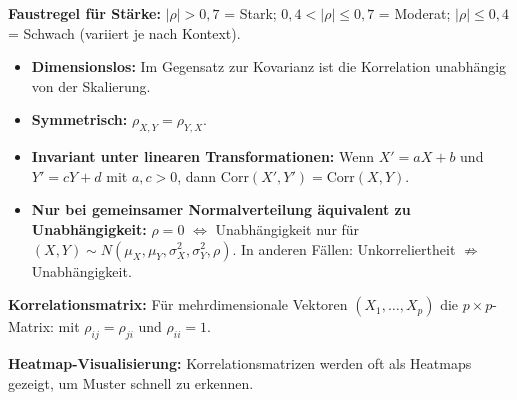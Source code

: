 \textbf{Faustregel für Stärke:} $|\rho| > 0{,}7$ = Stark; $0{,}4 < |\rho| \leq 0{,}7$ = Moderat; $|\rho| \leq 0{,}4$ = Schwach (variiert je nach Kontext).

\begin{itemize}[leftmargin=1.5em]
    \item \textbf{Dimensionslos:} Im Gegensatz zur Kovarianz ist die Korrelation unabhängig von der Skalierung.
    \item \textbf{Symmetrisch:} $\rho_{X,Y} = \rho_{Y,X}$.
    \item \textbf{Invariant unter linearen Transformationen:} Wenn $X' = aX + b$ und $Y' = cY + d$ mit $a, c > 0$, dann $\text{Corr}(X', Y') = \text{Corr}(X, Y)$.
    \item \textbf{Nur bei gemeinsamer Normalverteilung äquivalent zu Unabhängigkeit:} $\rho = 0$ $\Leftrightarrow$ Unabhängigkeit nur für $(X,Y) \sim N(\mu_X, \mu_Y, \sigma_X^2, \sigma_Y^2, \rho)$. In anderen Fällen: Unkorreliertheit $\not\Rightarrow$ Unabhängigkeit.
\end{itemize}

\textbf{Korrelationsmatrix:} Für mehrdimensionale Vektoren $(X_1, \ldots, X_p)$ die $p \times p$-Matrix:
mit $\rho_{ij} = \rho_{ji}$ und $\rho_{ii} = 1$.

\textbf{Heatmap-Visualisierung:} Korrelationsmatrizen werden oft als Heatmaps gezeigt, um Muster schnell zu erkennen.


